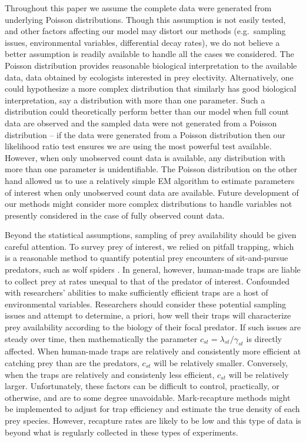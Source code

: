 \documentclass[smallextended]{svjour3}
\begin{document}
Throughout this paper we assume the complete data were generated from underlying Poisson distributions.  Though this assumption is not easily tested, and other factors affecting our model may distort our methods (e.g.\ sampling issues, environmental variables, differential decay rates), we do not believe a better assumption is readily available to handle all the cases we considered.  The Poisson distribution provides reasonable biological interpretation to the available data, data obtained by ecologists interested in prey electivity.  Alternatively, one could hypothesize a more complex distribution that similarly has good biological interpretation, say a distribution with more than one parameter.  Such a distribution could theoretically perform better than our model when full count data are observed and the sampled data were not generated from a Poisson distribution -- if the data were generated from a Poisson distribution then our likelihood ratio test ensures we are using the most powerful test available.  However, when only unobserved count data is available, any distribution with more than one parameter is unidentifiable.  The Poisson distribution on the other hand allowed us to use a relatively simple EM algorithm to estimate parameters of interest when only unobserved count data are available.  Future development of our methods might consider more complex distributions to handle variables not presently considered in the case of fully observed count data.

Beyond the statistical assumptions, sampling of prey availability should be given careful attention.  To survey prey of interest, we relied on pitfall trapping, which is a reasonable method to quantify potential prey encounters of sit-and-pursue predators, such as wolf spiders \citep{Uetz:1999}.  In general, however, human-made traps are liable to collect prey at rates unequal to that of the predator of interest.  Confounded with researchers' abilities to make sufficiently efficient traps are a host of environmental variables.  Researchers should consider these potential sampling issues and attempt to determine, a priori, how well their traps will characterize prey availability according to the biology of their focal predator.  If such issues are steady over time, then mathematically the parameter $c_{st} = \lambda_{st}/\gamma_{st}$ is directly affected.  When human-made traps are relatively and consistently more efficient at catching prey than are the predators, $c_{st}$ will be relatively smaller.  Conversely, when the traps are relatively and consistenly less efficient, $c_{st}$ will be relatively larger.  Unfortunately, these factors can be difficult to control, practically, or otherwise, and are to some degree unavoidable.  Mark-recapture methods might be implemented to adjust for trap efficiency and estimate the true density of each prey species.  However, recapture rates are likely to be low and this type of data is beyond what is regularly collected in these types of experiments. 
\end{document}

